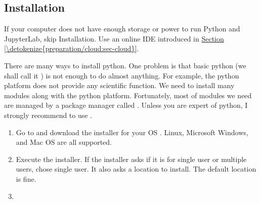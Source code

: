 \documentclass[letterpaper,10pt,english]{jupyterBook}
\begin{document}
\subsection{Installation \sphinxfootnotemark[1]}
\label{\detokenize{preparation/python:installation}}%
\begin{footnotetext}[1]\label{\thesphinxscope.1}%
\sphinxAtStartFootnote
If your computer does not have enough storage or power to run Python and JupyterLab, skip Installation.  Use an online IDE introduced in \hyperref[\detokenize{preparation/cloud:sec-cloud}]{Section \ref{\detokenize{preparation/cloud:sec-cloud}}}.
%
\end{footnotetext}\ignorespaces
\sphinxAtStartPar
There are many ways to install python.  One problem is that basic python (we shall call it ) is not enough to do almost anything. For example, the python platform does not provide any scientific function. We need to install many modules along with the python platform.  Fortunately, most of modules we need are managed by a package manager called .  Unless you are expert of python, I strongly recommend to use .
\begin{enumerate}
%
\item {}
\sphinxAtStartPar
{}Go to  and download the installer for your OS .  Linux, Microsoft Windows, and Mac OS are all supported.

\item {}
\sphinxAtStartPar
{}Execute the installer.  If the installer asks if it is for single user or multiple users, chose single user.  It also asks a location to install.  The default location is fine.

\item {}
\sphinxAtStartPar
{}

\end{enumerate}
\end{document}

